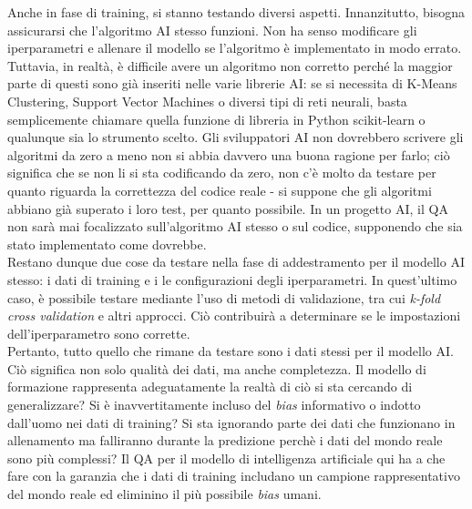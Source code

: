\documentclass[a4paper,12pt]{report}
\begin{document}
Anche in fase di training, si stanno testando diversi aspetti. Innanzitutto, bisogna assicurarsi che l'algoritmo AI stesso funzioni. Non ha senso modificare gli iperparametri e allenare il modello se l'algoritmo è implementato in modo errato. Tuttavia, in realtà, è difficile avere un algoritmo non corretto perché la maggior parte di questi sono già inseriti nelle varie librerie AI: se si necessita di K-Means Clustering, Support Vector  Machines o diversi tipi di reti neurali, basta semplicemente chiamare quella funzione di libreria in Python scikit-learn o qualunque sia lo strumento scelto. Gli sviluppatori AI non dovrebbero scrivere gli algoritmi da zero a meno non si abbia davvero una buona ragione per farlo; ciò significa che se non li si sta codificando da zero, non c'è molto da testare per quanto riguarda la correttezza del codice reale - si suppone che gli algoritmi abbiano già superato i loro test, per quanto possibile. In un progetto AI, il QA non sarà mai focalizzato sull'algoritmo AI stesso o sul codice, supponendo che sia stato implementato come dovrebbe.\\
Restano dunque due cose da testare nella fase di addestramento per il modello AI stesso: i dati di training e i le configurazioni degli iperparametri. In quest'ultimo caso, è possibile testare mediante l'uso di metodi di validazione, tra cui \textit{k-fold cross validation} e altri approcci. Ciò contribuirà a determinare se le impostazioni dell'iperparametro sono corrette.\\
Pertanto, tutto quello che rimane da testare sono i dati stessi per il modello AI. Ciò significa non solo qualità dei dati, ma anche completezza. Il modello di formazione rappresenta adeguatamente la realtà di ciò si sta cercando di generalizzare? Si è inavvertitamente incluso del \textit{bias} informativo o indotto dall'uomo nei dati di training? Si sta ignorando parte dei dati che funzionano in allenamento ma falliranno durante la predizione perchè i dati del mondo reale sono più complessi? Il QA per il modello di intelligenza artificiale qui ha a che fare con la garanzia che i dati di training includano un campione rappresentativo del mondo reale ed eliminino il più possibile \textit{bias} umani.\\~\\
\end{document}
